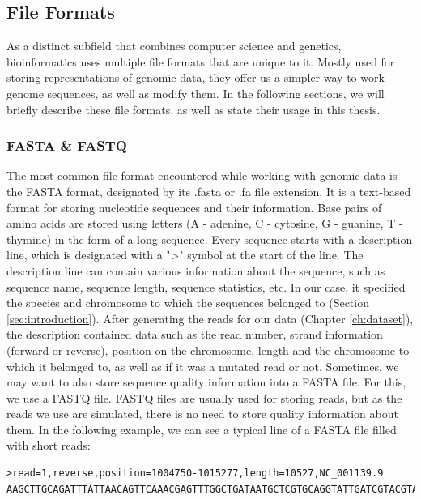 \documentclass[times, utf8, diplomski, english]{fer_eng}
\begin{document}
\subsection{File Formats}
\label{subsec:file formats}

As a distinct subfield that combines computer science and genetics, bioinformatics uses multiple file formats that are unique to it. Mostly used for storing representations of genomic data, they offer us a simpler way to work genome sequences, as well as modify them. In the following sections, we will briefly describe these file formats, as well as state their usage in this thesis.

\subsubsection{FASTA \& FASTQ}
\label{subsubsec:fasta and fastq}

The most common file format encountered while working with genomic data is the FASTA format, designated by its .fasta or .fa file extension. It is a text-based format for storing nucleotide sequences and their information. Base pairs of amino acids are stored using letters (A - adenine, C - cytosine, G - guanine, T - thymine) in the form of a long sequence. Every sequence starts with a description line, which is designated with a ">" symbol at the start of the line. The description line can contain various information about the sequence, such as sequence name, sequence length, sequence statistics, etc. In our case, it specified the species and chromosome to which the sequences belonged to (Section \ref{sec:introduction}). After generating the reads for our data (Chapter \ref{ch:dataset}), the description contained data such as the read number, strand information (forward or reverse), position on the chromosome, length and the chromosome to which it belonged to, as well as if it was a mutated read or not. Sometimes, we may want to also store sequence quality information into a FASTA file. For this, we use a FASTQ file. FASTQ files are usually used for storing reads, but as the reads we use are simulated, there is no need to store quality information about them. In the following example, we can see a typical line of a FASTA file filled with short reads:
\begin{lstlisting}
>read=1,reverse,position=1004750-1015277,length=10527,NC_001139.9
AAGCTTGCAGATTTATTAACAGTTCAAACGAGTTTGGCTGATAATGCTCGTGCAGGTATTGATCGTACGTACGTAGCTACGTG
\end{lstlisting}
\end{document}
